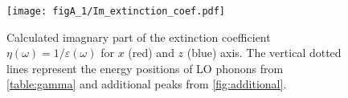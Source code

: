 \begin{figure}[tbh]
 \centering
  \texttt{[image: figA\_1/Im\_extinction\_coef.pdf]}
  \caption{Calculated imagnary part of the extinction coefficient $\eta(\omega) = 1/\varepsilon(\omega)$ for $x$ (red) and $z$ (blue) axis. The vertical dotted lines represent the energy positions of LO phonons from \cref{table:gamma} and additional peaks from \cref{fig:additional}.}
\label{fig:extinction}
\end{figure}